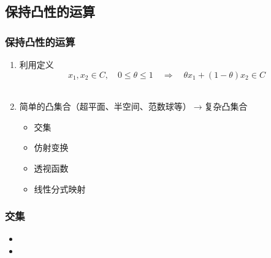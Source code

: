 \documentclass[handout]{beamer}
\begin{document}
\subsection{保持凸性的运算}
\begin{frame}
\frametitle{保持凸性的运算}


\begin{enumerate}[<+->]
\item 利用定义
\begin{equation}
	x_{1}, x_{2} \in C, \quad 0 \leq \theta \leq 1 \quad \Longrightarrow \quad \theta x_{1}+(1-\theta) x_{2} \in C
\end{equation}\\

\item {}  简单的凸集合（超平面、半空间、范数球等）$\rightarrow$复杂凸集合 
\bigskip
\begin{itemize}
	\item 交集
	\item 仿射变换
	\item 透视函数
	\item 线性分式映射
\end{itemize}
\end{enumerate}
\end{frame}
\begin{frame}
\frametitle{交集}


\begin{itemize}[<+->]
  \item
{}


\item {}
%
%


 \end{itemize}
\end{frame}
\end{document}
